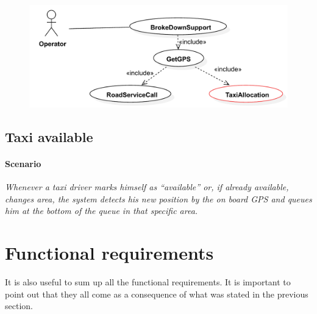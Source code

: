 \begin{figure}
	\includegraphics[width=\textwidth]{img/U_TaxiBrokeDown}
\end{figure}
	

\subsection{Taxi available}

\paragraph{Scenario}{\small\itshape Whenever a taxi driver marks himself as ``available'' or, if already available, changes area, the system detects his new position by the on board GPS and queues him at the bottom of the queue in that specific area.}


\section{Functional requirements}
It is also useful to sum up all the functional requirements. It is important to point out that they all come as a consequence of what was stated in the previous section.


